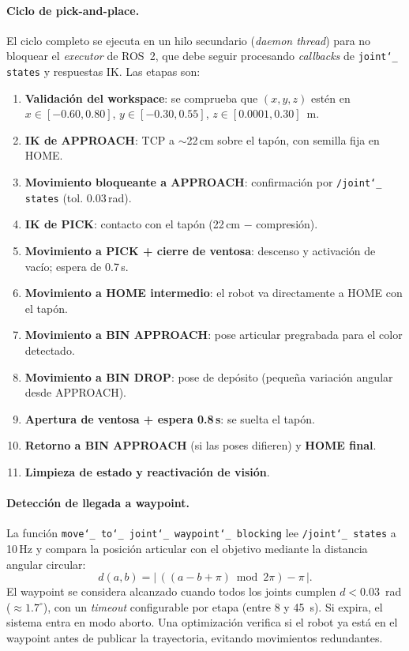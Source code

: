 \documentclass[12pt,a4paper]{article}
\newcommand{\code}[1]{%
  \begingroup
  \def\_{\char`_\penalty0 }%
  \def\/{\char`/\penalty0 }%
  \texttt{\small #1}%
  \endgroup}
\begin{document}
\paragraph{Ciclo de pick-and-place.}
El ciclo completo se ejecuta en un hilo secundario (\textit{daemon thread}) para no bloquear el
\textit{executor} de ROS~2, que debe seguir procesando \textit{callbacks} de \code{joint\_states} y
respuestas IK. Las etapas son:
\begin{enumerate}
  \item \textbf{Validación del workspace}: se comprueba que $(x,y,z)$ estén en
        $x\!\in\![-0.60,0.80]$, $y\!\in\![-0.30,0.55]$, $z\!\in\![0.0001,0.30]$~m.
  \item \textbf{IK de APPROACH}: TCP a $\sim$22\,cm sobre el tapón, con semilla fija en HOME.
  \item \textbf{Movimiento bloqueante a APPROACH}: confirmación por \code{/joint\_states} (tol. 0.03\,rad).
  \item \textbf{IK de PICK}: contacto con el tapón (22\,cm $-$ compresión).
  \item \textbf{Movimiento a PICK + cierre de ventosa}: descenso y activación de vacío; espera de 0.7\,s.
  \item \textbf{Movimiento a HOME intermedio}: el robot va directamente a HOME con el tapón.
  \item \textbf{Movimiento a BIN APPROACH}: pose articular pregrabada para el color detectado.
  \item \textbf{Movimiento a BIN DROP}: pose de depósito (pequeña variación angular desde APPROACH).
  \item \textbf{Apertura de ventosa + espera 0.8\,s}: se suelta el tapón.
  \item \textbf{Retorno a BIN APPROACH} (si las poses difieren) y \textbf{HOME final}.
  \item \textbf{Limpieza de estado y reactivación de visión}.
\end{enumerate}

\clearpage
\paragraph{Detección de llegada a waypoint.}
La función \code{move\_to\_joint\_waypoint\_blocking} lee \code{/joint\_states} a 10\,Hz y compara la
posición articular con el objetivo mediante la distancia angular circular:
\begin{equation}
d(a,b)=\bigl|\,((a-b+\pi)\bmod 2\pi)-\pi\,\bigr|.
\end{equation}
El waypoint se considera alcanzado cuando todos los joints cumplen $d<0.03$~rad ($\approx 1.7^\circ$),
con un \textit{timeout} configurable por etapa (entre 8 y 45~s). Si expira, el sistema entra en modo
aborto. Una optimización verifica si el robot ya está en el waypoint antes de publicar la trayectoria,
evitando movimientos redundantes.
\end{document}
